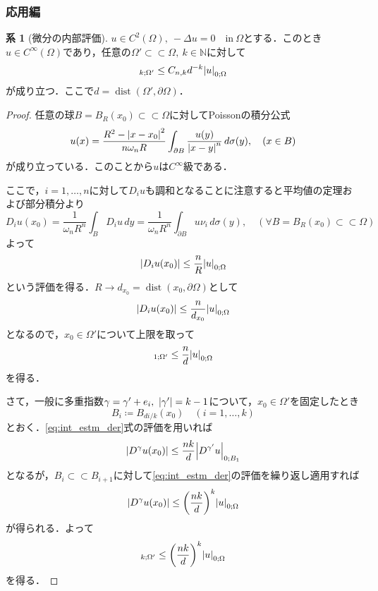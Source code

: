 \documentclass[a4paper]{ltjsarticle}
\newcommand{\Nset}{\mathbb{N}}
\newcommand{\Om}{\Omega}
\newcommand{\pOm}{\partial\Omega}
\newcommand{\ssubset}{\subset\subset}
\newcommand{\inn}{\quad\text{in}\ }
\newcommand{\1}{\mathbbm{1}}
\DeclareMathOperator{\dist}{\mathrm{dist}}
\numberwithin{equation}{section}
\theoremstyle{definition}
\newtheorem{cor}[thm]{系}
\begin{document}
\subsubsection{応用編}
\begin{cor}[微分の内部評価]\label{cor:int_est_der}
    $u\in C^2(\Om),\ -\Delta u=0\inn \Om$とする．このとき$u\in C^\infty(\Om)$であり，任意の$\Om'\ssubset \Om,\ k\in\Nset$に対して
    \begin{equation}
        [u]_{k;\Om'}\leq C_{n,k}d^{-k} \abs{u}_{0;\Om} 
    \end{equation}
    が成り立つ．ここで$d=\dist(\Om',\pOm)$．
\end{cor}
\begin{proof}
    任意の球$B=B_R(x_0)\ssubset \Om$に対してPoissonの積分公式
    \begin{equation}
        u(x)=\frac{R^2-\abs{x-x_0}^2}{n\omega_n R}\int_{\partial B}\frac{u(y)}{\abs{x-y}^n}\,d\sigma(y),\quad (x\in B)  
    \end{equation}
    が成り立っている．このことから$u$は$C^\infty$級である．

    ここで，$i=1,\ldots,n$に対して$D_i u$も調和となることに注意すると平均値の定理および部分積分より
    \begin{equation}
        D_iu(x_0)=\frac{1}{\omega_n R^n}\int_{B}D_i u\,dy=\frac{1}{\omega_nR^n}\int_{\partial B}u\nu_i\,d\sigma(y),\quad (\forall B=B_R(x_0)\ssubset \Om)
    \end{equation}
    よって
    \begin{equation}
        \abs{D_iu(x_0)}\leq \frac{n}{R}\abs{u}_{0;\Om}
    \end{equation}
    という評価を得る．$R\to d_{x_0}=\dist(x_0,\pOm)$として
    \begin{equation}
        \abs{D_iu(x_0)}\leq \frac{n}{d_{x_0}}\abs{u}_{0;\Om}\label{eq:int_estm_der}
    \end{equation}
    となるので，$x_0\in \Om'$について上限を取って
    \begin{equation}
        [u]_{1;\Om'}\leq \frac{n}{d}\abs{u}_{0;\Om} 
    \end{equation}
    を得る．

    さて，一般に多重指数$\gamma=\gamma'+e_i,\ \abs{\gamma'}=k-1$について，$x_0\in \Om'$を固定したとき
    \begin{equation}
        B_i\coloneqq B_{di/k}(x_0)\quad (i=1,\ldots,k)
    \end{equation}
    とおく．\eqref{eq:int_estm_der}式の評価を用いれば
    \begin{equation}
        \abs{D^\gamma u(x_0)}\leq \frac{nk}{d}\abs{D^{\gamma'} u}_{0;B_{1}}
    \end{equation}
    となるが，$B_i\ssubset B_{i+1}$に対して\eqref{eq:int_estm_der}の評価を繰り返し適用すれば
    \begin{equation}
        \abs{D^\gamma u(x_0)}\leq \qty(\frac{nk}{d})^{k}\abs{u}_{0;\Om}
    \end{equation}
    が得られる．よって
    \begin{equation}
        [u]_{k;\Om'}\leq \qty(\frac{nk}{d})^k\abs{u}_{0;\Om} 
    \end{equation}
    を得る．
\end{proof}
\end{document}
